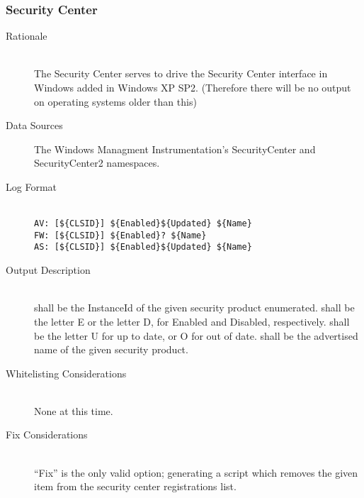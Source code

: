 \subsubsection{Security Center}
\begin{description}
\item[Rationale] \hfill \\
The Security Center serves to drive the Security Center interface in Windows
added in Windows XP SP2. (Therefore there will be no output on operating
systems older than this)
\item[Data Sources] \hfill
The Windows Managment Instrumentation's SecurityCenter and SecurityCenter2
namespaces.
\item[Log Format] \hfill \\
\verb|AV: [${CLSID}] ${Enabled}${Updated} ${Name}| \\
\verb|FW: [${CLSID}] ${Enabled}? ${Name}| \\
\verb|AS: [${CLSID}] ${Enabled}${Updated} ${Name}|
\item[Output Description] \hfill \\
 shall be the InstanceId of the given security product enumerated.
 shall be the letter E or the letter D, for Enabled and Disabled,
respectively.  shall be the letter U for up to date, or O for out
of date.  shall be the advertised name of the given security product.
\item[Whitelisting Considerations] \hfill \\
None at this time.
\item[Fix Considerations] \hfill \\
``Fix'' is the only valid option; generating a script which removes the given
item from the security center registrations list.
\end{description}

